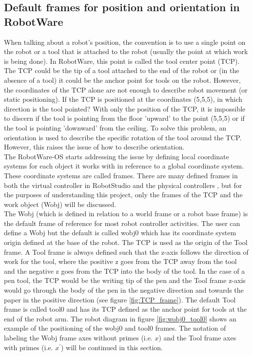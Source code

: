 \documentclass{cslthse-msc}
\begin{document}
\subsection{Default frames for position and orientation in RobotWare}
\label{sec:Tech_Back:Rob_Move:frames}
When talking about a robot's position, the convention is to use a single point on the robot or a tool that is attached to the robot (usually the point at which work is being done). In RobotWare, this point is called the tool center point (TCP). The TCP could be the tip of a tool attached to the end of the robot or (in the absence of a tool) it could be the anchor point for tools on the robot. However, the coordinates of the TCP alone are not enough to describe robot movement (or static positioning). If the TCP is positioned at the coordinates (5,5,5), in which direction is the tool pointed? With only the position of the TCP, it is impossible to discern if the tool is pointing from the floor 'upward' to the point (5,5,5) or if the tool is pointing 'downward' from the ceiling. To solve this problem, an orientation is used to describe the specific rotation of the tool around the TCP. However, this raises the issue of how to describe orientation.\\
The RobotWare-OS starts addressing the issue by defining local coordinate systems for each object it works with in reference to a global coordinate system. These coordinate systems are called frames. There are many defined frames in both the virtual controller in RobotStudio and the physical controllers \cite[Sec. 1.2.6]{ABB:robotstudio}, but for the purposes of understanding this project, only the frames of the TCP and the work object (Wobj) will be discussed.\\
The Wobj (which is defined in relation to a world frame or a robot base frame) is the default frame of reference for most robot controller activities. The user can define a Wobj but the default is called wobj0 which has its coordinate system origin defined at the base of the robot. The TCP is used as the origin of the Tool frame. A Tool frame is always defined such that the z-axis follows the direction of work for the tool, where the positive z goes from the TCP away from the tool and the negative z goes from the TCP into the body of the tool. In the case of a pen tool, the TCP would be the writing tip of the pen and the Tool frame z-axis would go through the body of the pen in the negative direction and towards the paper in the positive direction (see figure \ref{fig:TCP_frame}). The default Tool frame is called tool0 and has its TCP defined as the anchor point for tools at the end of the robot arm. The robot diagram in figure \ref{fig:wobj0_tool0} shows an example of the positioning of the wobj0 and tool0 frames. The notation of labeling the Wobj frame axes without primes (i.e. $x$) and the Tool frame axes with primes (i.e. $x^\prime$) will be continued in this section. 
\end{document}
